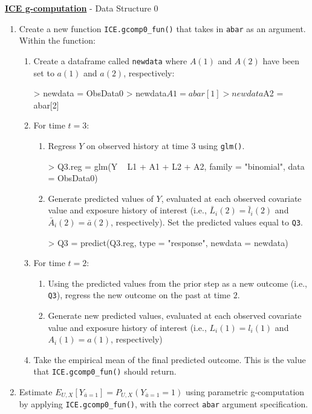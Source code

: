 \documentclass[answers]{exam}
\begin{document}
\noindent\textbf{\underline{ICE g-computation}} - Data Structure 0
\begin{enumerate}
\item Create a new function \texttt{ICE.gcomp0\_fun()} that takes in \texttt{abar} as an argument. Within the function:
\begin{enumerate}
\item Create a dataframe called \texttt{newdata} where $A(1)$ and $A(2)$ have been set to $a(1)$ and $a(2)$, respectively:
\begin{Schunk}
\begin{Sinput}
> newdata = ObsData0
> newdata$A1 = abar[1]
> newdata$A2 = abar[2]
\end{Sinput}
\end{Schunk}
\item For time $t = 3$:
\begin{enumerate}
\item Regress $Y$ on observed history at time 3 using \texttt{glm()}.
\begin{Schunk}
\begin{Sinput}
> Q3.reg = glm(Y ~ L1 + A1 + L2 + A2, family = "binomial", data = ObsData0)
\end{Sinput}
\end{Schunk}
\item Generate predicted values of $Y$, evaluated at each observed covariate value and exposure history of interest (i.e., $\bar{L}_i(2) = \bar{l}_i(2)$ and $\bar{A}_i(2) = \bar{a}(2)$, respectively). Set the predicted values equal to \texttt{Q3}.
\begin{Schunk}
\begin{Sinput}
> Q3 = predict(Q3.reg, type = "response", newdata = newdata)
\end{Sinput}
\end{Schunk}
\end{enumerate}
\item For time $t = 2$:
\begin{enumerate}
\item Using the predicted values from the prior step as a new outcome (i.e., \texttt{Q3}), regress the new outcome on the past at time $2$.
\item Generate new predicted values, evaluated at each observed covariate value and exposure history of interest (i.e., $L_i(1) = l_i(1)$ and $A_i(1) = a(1)$, respectively)
\end{enumerate}
\item Take the empirical mean of the final predicted outcome. This is the value that \texttt{ICE.gcomp0\_fun()} should return.
\end{enumerate}
\item Estimate $E_{U,X}[Y_{\bar{a} = 1}] = P_{U,X}(Y_{\bar{a} = 1} = 1)$ using parametric g-computation by applying \texttt{ICE.gcomp0\_fun()}, with the correct \texttt{abar} argument specification.
\end{enumerate}
\end{document}
